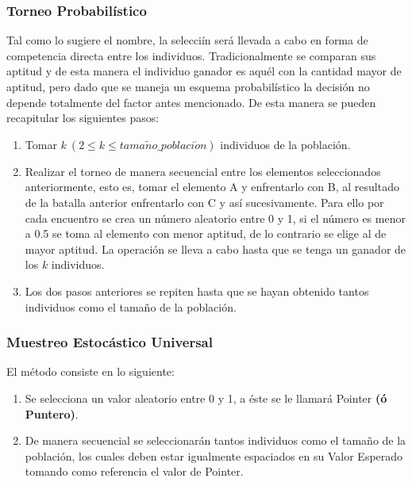 \documentclass[class=report, crop=false]{standalone}
\begin{document}
\subsubsection{Torneo Probabilístico}
Tal como lo sugiere el nombre, la selecciín será llevada a 
cabo en forma de competencia directa entre los individuos.\break
Tradicionalmente se comparan sus aptitud y de esta manera 
el individuo ganador es aquél con la cantidad mayor de aptitud, 
pero dado que se maneja un esquema probabilístico la 
decisión no depende totalmente del factor antes mencionado.\medskip\break
De esta manera se pueden recapitular los siguientes pasos:

\begin{enumerate}
\item Tomar $k\ (2 \leqslant k \leqslant tama\tilde{n}o\_poblaci\acute{o}n)$ individuos 
de la población.
\item Realizar el torneo de manera secuencial entre los 
elementos seleccionados anteriormente, esto es, tomar el 
elemento A y enfrentarlo con B, al resultado de la batalla 
anterior enfrentarlo con C y así sucesivamente.\break
Para ello por cada encuentro se crea un número aleatorio 
entre 0 y 1, si el número es menor a 0.5 se toma al elemento 
con menor aptitud, de lo contrario se elige al de mayor aptitud.\break
La operación se lleva a cabo hasta que se tenga un ganador 
de los $k$ individuos.
\item Los dos pasos anteriores se repiten hasta que se hayan 
obtenido tantos individuos como el tamaño de la población.
\end{enumerate}

\subsubsection{Muestreo Estocástico Universal}
El método consiste en lo siguiente:

\begin{enumerate}
\item Se selecciona un valor aleatorio entre 0 y 1, a éste se le 
llamará Pointer \textbf{(ó Puntero)}.
\item De manera secuencial se seleccionarán tantos individuos 
como el tamaño de la población, los cuales deben estar igualmente 
espaciados en su Valor Esperado tomando como referencia el valor 
de Pointer.
\end{enumerate}
\end{document}
